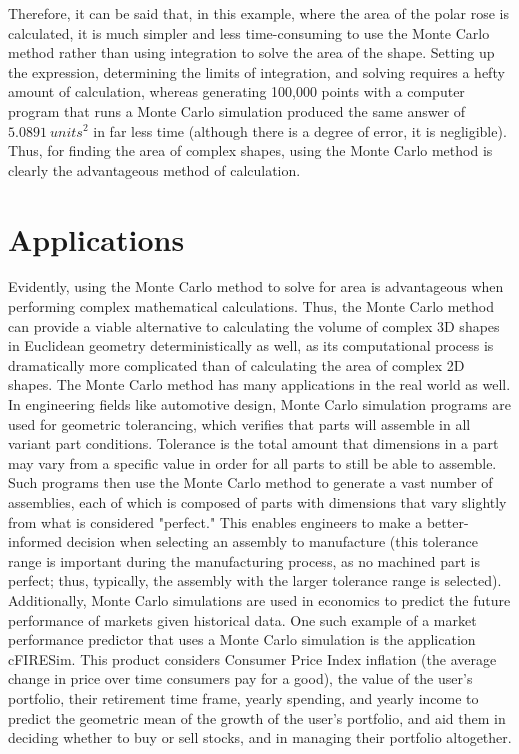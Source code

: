 \documentclass[11pt]{article}
\begin{document}
Therefore, it can be said that, in this example, where the area of the polar rose is calculated, it is much simpler and less time-consuming to use the Monte Carlo method rather than using integration to solve the area of the shape. Setting up the expression, determining the limits of integration, and solving requires a hefty amount of calculation, whereas generating 100,000 points with a computer program that runs a Monte Carlo simulation produced the same answer of $5.0891 \ units^2$ in far less time (although there is a degree of error, it is negligible). Thus, for finding the area of complex shapes, using the Monte Carlo method is clearly the advantageous method of calculation.

\section{Applications}

Evidently, using the Monte Carlo method to solve for area is advantageous when performing complex mathematical calculations. Thus, the Monte Carlo method can provide a viable alternative to calculating the volume of complex 3D shapes in Euclidean geometry deterministically as well, as its computational process is dramatically more complicated than of calculating the area of complex 2D shapes. The Monte Carlo method has many applications in the real world as well. In engineering fields like automotive design, Monte Carlo simulation programs are used for geometric tolerancing, which verifies that parts will assemble in all variant part conditions. Tolerance is the total amount that dimensions in a part may vary from a specific value in order for all parts to still be able to assemble. Such programs then use the Monte Carlo method to generate a vast number of assemblies, each of which is composed of parts with dimensions that vary slightly from what is considered "perfect." This enables engineers to make a better-informed decision when selecting an assembly to manufacture (this tolerance range is important during the manufacturing process, as no machined part is perfect; thus, typically, the assembly with the larger tolerance range is selected). \cite{catia}\\[3ex]

Additionally, Monte Carlo simulations are used in economics to predict the future performance of markets given historical data. One such example of a market performance predictor that uses a Monte Carlo simulation is the application cFIRESim. This product considers Consumer Price Index inflation (the average change in price over time consumers pay for a good), the value of the user's portfolio, their retirement time frame, yearly spending, and yearly income to predict the geometric mean of the growth of the user's portfolio, and aid them in deciding whether to buy or sell stocks, and in managing their portfolio altogether. \cite{cfiresim} 
\end{document}

